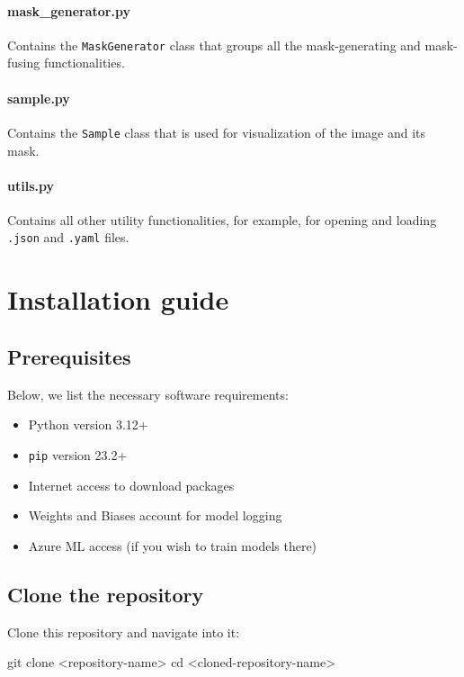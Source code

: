 \paragraph{mask\_generator.py}
Contains the \texttt{MaskGenerator} class that groups all the
mask-generating and mask-fusing functionalities.

\paragraph{sample.py}
Contains the \texttt{Sample} class that is used for visualization of the
image and its mask.

\paragraph{utils.py}
Contains all other utility functionalities, for example, for opening and
loading \texttt{.json} and \texttt{.yaml} files.

\section{Installation guide}\label{installation-guide}

\subsection{Prerequisites}\label{prerequisites}

Below, we list the necessary software requirements: 

\begin{itemize}
    \item Python version 3.12+
    \item \texttt{pip} version 23.2+
    \item Internet access to download packages
    \item Weights and Biases account for model logging
    \item Azure ML
access (if you wish to train models there)
\end{itemize}

\subsection{Clone the repository}\label{clone-the-repository}

Clone this repository and navigate into it:

\begin{bashlisting}
git clone <repository-name>
cd <cloned-repository-name>
\end{bashlisting}

